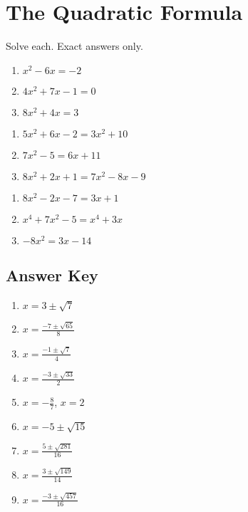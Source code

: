 \chapter{The Quadratic Formula}

Solve each. Exact answers only.

\begin{multicols}{3}
\begin{enumerate}
	\item $x^2-6x=-2$
	\item $4x^2 + 7x - 1 = 0$
    \item $8x^2 + 4x = 3$
\end{enumerate}	\setcounter{Review}{\value{enumi}}
\end{multicols}
\begin{multicols}{3}
\begin{enumerate}		\setcounter{enumi}{\value{Review}}
    \item $5x^2 + 6x - 2 = 3x^2 + 10$
    \item $7x^2-5 = 6x+11$
    \item $8x^2+2x+1=7x^2-8x-9$
\end{enumerate}	\setcounter{Review}{\value{enumi}}
\end{multicols}
\begin{multicols}{3}
\begin{enumerate}		\setcounter{enumi}{\value{Review}}
    \item $8x^2 - 2x - 7 = 3x + 1$
    \item $x^4+7x^2-5=x^4+3x$
    \item $-8x^2=3x-14$
\end{enumerate}	\setcounter{Review}{\value{enumi}}
\end{multicols}


\newpage

\section{Answer Key}

\begin{enumerate}
	\item $x = 3 \pm \sqrt{7}$
	\item $x = \frac{-7 \pm \sqrt{65}}{8}$
    \item $x = \frac{-1 \pm \sqrt{7}}{4}$
    \item $x = \frac{-3 \pm \sqrt{33}}{2}$
    \item $x = -\frac{8}{7}$, $x = 2$
    \item $x = -5 \pm \sqrt{15}$
    \item $x = \frac{5 \pm \sqrt{281}}{16}$
    \item $x = \frac{3 \pm \sqrt{149}}{14}$
    \item $x = \frac{-3 \pm \sqrt{457}}{16}$
\end{enumerate}